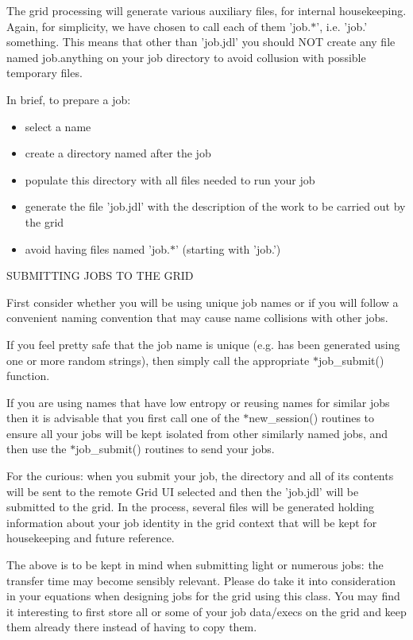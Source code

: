 The grid processing will generate various auxiliary files, for internal housekeeping. Again, for simplicity, we have chosen to call each of them 'job.$\ast$', i.e. 'job.' something. This means that other than 'job.jdl' you should NOT create any file named job.anything on your job directory to avoid collusion with possible temporary files.

In brief, to prepare a job:\begin{itemize}
\item select a name\item create a directory named after the job\item populate this directory with all files needed to run your job\item generate the file 'job.jdl' with the description of the work to be carried out by the grid\item avoid having files named 'job.$\ast$' (starting with 'job.')\end{itemize}


SUBMITTING JOBS TO THE GRID

First consider whether you will be using unique job names or if you will follow a convenient naming convention that may cause name collisions with other jobs.

If you feel pretty safe that the job name is unique (e.g. has been generated using one or more random strings), then simply call the appropriate $\ast$job\_\-submit() function.

If you are using names that have low entropy or reusing names for similar jobs then it is advisable that you first call one of the $\ast$new\_\-session() routines to ensure all your jobs will be kept isolated from other similarly named jobs, and then use the $\ast$job\_\-submit() routines to send your jobs.

For the curious: when you submit your job, the directory and all of its contents will be sent to the remote Grid UI selected and then the 'job.jdl' will be submitted to the grid. In the process, several files will be generated holding information about your job identity in the grid context that will be kept for housekeeping and future reference.

The above is to be kept in mind when submitting light or numerous jobs: the transfer time may become sensibly relevant. Please do take it into consideration in your equations when designing jobs for the grid using this class. You may find it interesting to first store all or some of your job data/execs on the grid and keep them already there instead of having to copy them.

